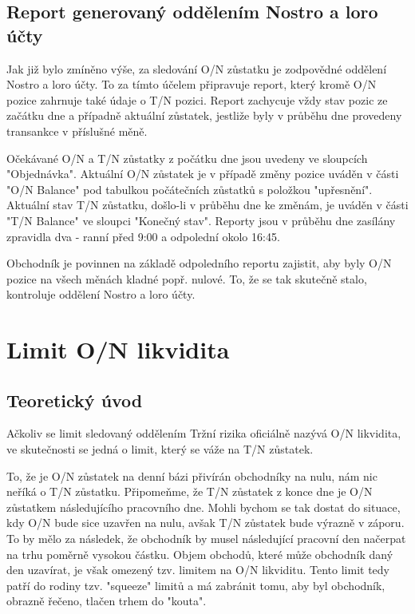 \documentclass[a4paper]{book}
\begin{document}
\subsection{Report generovaný oddělením Nostro a loro účty}

Jak již bylo zmíněno výše, za sledování O/N zůstatku je zodpovědné oddělení Nostro a loro účty. To za tímto účelem připravuje report, který kromě O/N pozice zahrnuje také údaje o T/N pozici. Report zachycuje vždy stav pozic ze začátku dne a případně aktuální zůstatek, jestliže byly v průběhu dne provedeny transankce v příslušné měně.

Očekávané O/N a T/N zůstatky z počátku dne jsou uvedeny ve sloupcích "Objednávka". Aktuální O/N zůstatek je v případě změny pozice uváděn v části "O/N Balance" pod tabulkou počátečních zůstatků s položkou "upřesnění". Aktuální stav T/N zůstatku, došlo-li v průběhu dne ke změnám, je uváděn v části "T/N Balance" ve sloupci "Konečný stav". Reporty jsou v průběhu dne zasílány zpravidla dva - ranní před 9:00 a odpolední okolo 16:45.

Obchodník je povinnen na základě odpoledního reportu zajistit, aby byly O/N pozice na všech měnách kladné popř. nulové. To, že se tak skutečně stalo, kontroluje oddělení Nostro a loro účty.

\section{Limit O/N likvidita}

\subsection{Teoretický úvod}

Ačkoliv se limit sledovaný oddělením Tržní rizika oficiálně nazývá O/N likvidita, ve skutečnosti se jedná o limit, který se váže na T/N zůstatek.

To, že je O/N zůstatek na denní bázi přivírán obchodníky na nulu, nám nic neříká o T/N zůstatku. Připomeňme, že T/N zůstatek z konce dne je O/N zůstatkem následujícího pracovního dne. Mohli bychom se tak dostat do situace, kdy O/N bude sice uzavřen na nulu, avšak T/N zůstatek bude výrazně v záporu. To by mělo za následek, že obchodník by musel následující pracovní den načerpat na trhu poměrně vysokou částku. Objem obchodů, které může obchodník daný den uzavírat, je však omezený tzv. limitem na O/N likviditu. Tento limit tedy patří do rodiny tzv. "squeeze" limitů a má zabránit tomu, aby byl obchodník, obrazně řečeno, tlačen trhem do "kouta".
\end{document}
